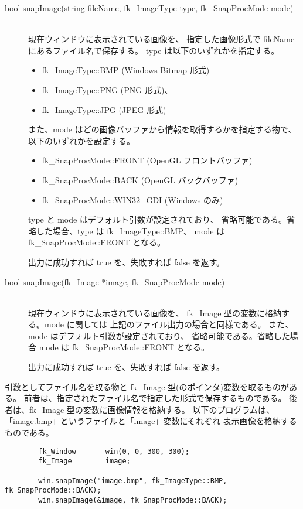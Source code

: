 \begin{description}
 \item[bool snapImage(string fileName, fk\_ImageType type, fk\_SnapProcMode mode)] ~ \\
現在ウィンドウに表示されている画像を、
指定した画像形式で fileName にあるファイル名で保存する。
type は以下のいずれかを指定する。
\begin{itemize}
 \item fk\_ImageType::BMP (Windows Bitmap 形式)
 \item fk\_ImageType::PNG (PNG 形式)、
 \item fk\_ImageType::JPG (JPEG 形式)
\end{itemize}

また、mode はどの画像バッファから情報を取得するかを指定する物で、
以下のいずれかを設定する。
\begin{itemize}
 \item fk\_SnapProcMode::FRONT (OpenGL フロントバッファ)
 \item fk\_SnapProcMode::BACK (OpenGL バックバッファ)
 \item fk\_SnapProcMode::WIN32\_GDI (Windows のみ)
\end{itemize}

type と mode はデフォルト引数が設定されており、
省略可能である。省略した場合、type は fk\_ImageType::BMP、
mode は fk\_SnapProcMode::FRONT となる。

出力に成功すれば true を、失敗すれば false を返す。\\

\item[bool snapImage(fk\_Image *image, fk\_SnapProcMode mode)] ~ \\
現在ウィンドウに表示されている画像を、
fk\_Image 型の変数に格納する。mode に関しては
上記のファイル出力の場合と同様である。
また、mode はデフォルト引数が設定されており、
省略可能である。省略した場合 mode は fk\_SnapProcMode::FRONT となる。

出力に成功すれば true を、失敗すれば false を返す。
\end{description}

引数としてファイル名を取る物と fk\_Image 型(のポインタ)変数を取るものがある。
前者は、指定されたファイル名で指定した形式で保存するものである。
後者は、fk\_Image 型の変数に画像情報を格納する。
以下のプログラムは、「image.bmp」というファイルと「image」変数にそれぞれ
表示画像を格納するものである。
\\
\begin{screen}
\begin{verbatim}
        fk_Window       win(0, 0, 300, 300);
        fk_Image        image;

        win.snapImage("image.bmp", fk_ImageType::BMP, fk_SnapProcMode::BACK);
        win.snapImage(&image, fk_SnapProcMode::BACK);
\end{verbatim}
\end{screen}

